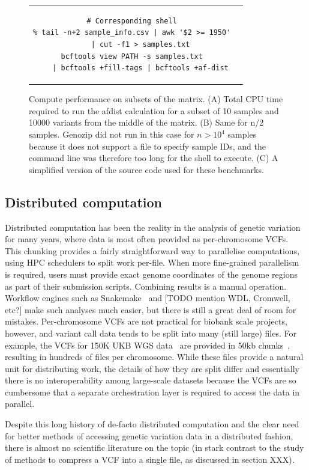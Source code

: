 \documentclass[a4paper,num-refs]{oup-contemporary}
\begin{document}
\begin{figure}
\begin{tabular}{cc}
\begin{tcolorbox}[width=7cm]
\begin{verbatim}
# Corresponding shell
% tail -n+2 sample_info.csv | awk '$2 >= 1950'
    | cut -f1 > samples.txt
bcftools view PATH -s samples.txt
    | bcftools +fill-tags | bcftools +af-dist
\end{verbatim}
\end{tcolorbox}
\end{tabular}
\caption{Compute performance on subsets of the matrix.
(A) Total CPU time required to run the afdist calculation for
a subset of 10 samples and 10000 variants from the middle of the matrix.
(B) Same for n/2 samples. Genozip did not run in this case for
$n > 10^4$ samples because it does not support a file to specify
sample IDs, and the command line was therefore too long for the shell
to execute.
(C) A simplified version of the source code used for these benchmarks.
\label{fig-subset-matrix-compute}}
\end{figure}


\subsection{Distributed computation}
Distributed computation has been the reality in the analysis
of genetic variation for many years,
where data is most often provided as per-chromosome VCFs.
This chunking provides a fairly straightforward way to parallelise
computations, using HPC schedulers to split work per-file.
When more fine-grained parallelism is required, users must
provide exact genome coordinates of the genome regions
as part of their submission scripts. Combining results
is a manual operation.
Workflow engines such as
Snakemake~\cite{koster2012snakemake,molder2021sustainable}
and [TODO mention WDL, Cromwell, etc?] make such analyses
much easier, but there is still a great deal of room for
mistakes.
Per-chromosome VCFs are not practical for biobank scale
projects, however, and variant call data tends to be split
into many (still large) files.
For example, the VCFs for 150K UKB WGS data~\cite{halldorsson2022sequences}
are provided in 50kb chunks~\cite{browning2023statistical}, resulting in
hundreds of files per chromosome.
While these files provide a natural
unit for distributing work, the details of how they
are split differ and essentially there is
no interoperability among large-scale datasets because the VCFs are
so cumbersome that a separate orchestration layer is required to
access the data in parallel.

Despite this long history of de-facto distributed computation
and the clear need for better methods of accessing genetic
variation data in a distributed fashion, there is almost
no scientific literature on the topic (in stark contrast to the
study of methods to compress a VCF into a single file,
as discussed in section XXX).
\end{document}
